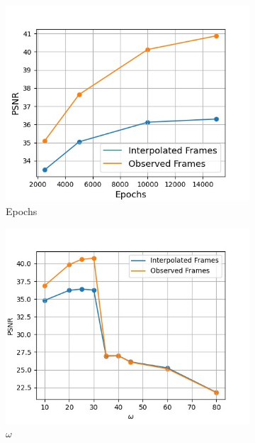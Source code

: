 \documentclass{article}
\begin{document}
\begin{figure}[h]
\begin{subfigure}{0.31\textwidth}
	\centering
    \includegraphics[width=1\linewidth]{Epochs.jpg}
    \caption{Epochs}
\end{subfigure}

\begin{subfigure}{0.3\textwidth}
\centering
    \includegraphics[width=1\linewidth]{omega.jpg}
    \caption{$\omega$}
\end{subfigure}%
\begin{subfigure}{0.3\textwidth}
\centering


\end{subfigure}
\end{figure}
\end{document}
